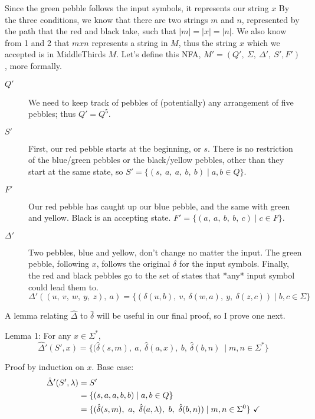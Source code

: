 \documentclass[11pt]{article}
\begin{document}
Since the green pebble follows the input symbols, it represents our string $x$  By the three conditions, we know that there are two strings $m$ and $n$, represented by the path that the red and black take, such that $|m| = |x| = |n|$. We also know from 1 and 2 that $mxn$ represents a string in $M$, thus the string $x$ which we accepted is in MiddleThirds $M$. Let's define this NFA, $M' = (Q',\ \Sigma,\ \Delta',\ S', F')$, more formally.

\begin{description}
	\item[$Q'$] We need to keep track of pebbles of (potentially) any arrangement of five pebbles; thus $Q' = Q^5$.
	\item[$S'$] First, our red pebble starts at the beginning, or $s$. There is no restriction of the blue/green pebbles or the black/yellow pebbles, other than they start at the same state, so $S' = \{(s,\ a,\ a,\ b,\ b) \mid a,b \in Q\}$.
	\item[$F'$] Our red pebble has caught up our blue pebble, and the same with green and yellow. Black is an accepting state. $F' = \{(a,\ a,\ b,\ b,\ c) \mid c \in F \}$.
	\item[$\Delta'$] Two pebbles, blue and yellow, don't change no matter the input. The green pebble, following $x$, follows the original $\delta$ for the input symbols. Finally, the red and black pebbles go to the set of states that *any* input symbol could lead them to.
	\[ \Delta'((u,\ v,\ w,\ y,\ z),\ a) = \{(\delta(u,b),\ v,\ \delta(w,a),\ y,\ \delta(z,c)) \mid b,c \in \Sigma \} \]

\end{description}

A lemma relating $\hat{\Delta}$ to $\hat{\delta}$ will be useful in our final proof, so I prove one next.



Lemma 1: For any $x \in \Sigma^*$, 
	\[ \hat{\Delta}'(S', x) = \{(\hat{\delta}(s,m),\ a,\ \hat{\delta}(a,x),\ b,\ \hat{\delta}(b,n)\ \mid m,n \in \Sigma^*\}\]
	
	Proof by induction on $x$. Base case: 
\begin{align*}
	\hat{\Delta}'(S', \lambda) &= S' \\
	&= \{(s,a,a,b,b) \mid a,b \in Q\} \\
	&= \{ ( \hat{\delta}(s,m),\  a,\ \hat{\delta}(a, \lambda),\ b,\ \hat{\delta}(b,n)) \mid m,n  \in \Sigma^0\}\ \text{\checkmark}	
\end{align*}
\end{document}

